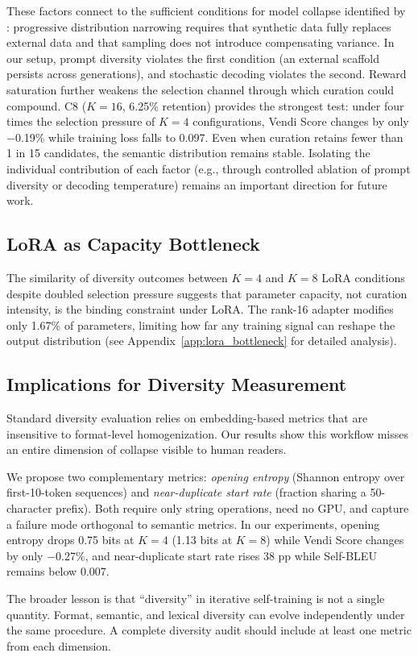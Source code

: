 These factors connect to the sufficient conditions for model collapse identified by \citet{placeholder_shumailov}: progressive distribution narrowing requires that synthetic data fully replaces external data and that sampling does not introduce compensating variance. In our setup, prompt diversity violates the first condition (an external scaffold persists across generations), and stochastic decoding violates the second. Reward saturation further weakens the selection channel through which curation could compound. C8 ($K{=}16$, 6.25\% retention) provides the strongest test: under four times the selection pressure of $K{=}4$ configurations, Vendi Score changes by only $-$0.19\% while training loss falls to 0.097. Even when curation retains fewer than 1 in 15 candidates, the semantic distribution remains stable. Isolating the individual contribution of each factor (e.g., through controlled ablation of prompt diversity or decoding temperature) remains an important direction for future work.

\subsection{LoRA as Capacity Bottleneck}
\label{sec:lora_bottleneck}

The similarity of diversity outcomes between $K{=}4$ and $K{=}8$ LoRA conditions despite doubled selection pressure suggests that parameter capacity, not curation intensity, is the binding constraint under LoRA. The rank-16 adapter modifies only 1.67\% of parameters, limiting how far any training signal can reshape the output distribution (see Appendix~\ref{app:lora_bottleneck} for detailed analysis).

\subsection{Implications for Diversity Measurement}
\label{sec:measurement_implications}

Standard diversity evaluation relies on embedding-based metrics that are insensitive to format-level homogenization. Our results show this workflow misses an entire dimension of collapse visible to human readers.

We propose two complementary metrics: \emph{opening entropy} (Shannon entropy over first-10-token sequences) and \emph{near-duplicate start rate} (fraction sharing a 50-character prefix). Both require only string operations, need no GPU, and capture a failure mode orthogonal to semantic metrics. In our experiments, opening entropy drops 0.75 bits at $K{=}4$ (1.13 bits at $K{=}8$) while Vendi Score changes by only $-$0.27\%, and near-duplicate start rate rises 38 pp while Self-BLEU remains below 0.007.

The broader lesson is that ``diversity'' in iterative self-training is not a single quantity. Format, semantic, and lexical diversity can evolve independently under the same procedure. A complete diversity audit should include at least one metric from each dimension.